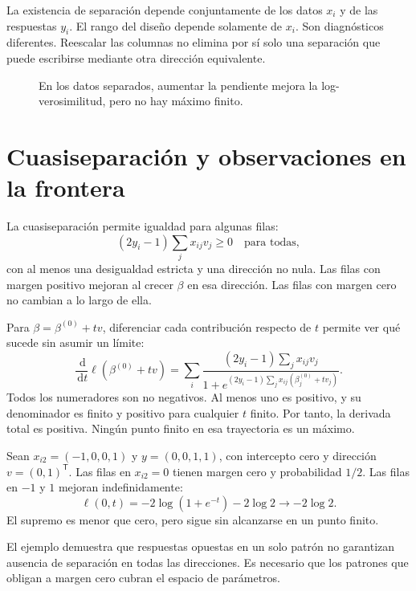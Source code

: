 \documentclass[11pt,a4paper]{article}
\newcommand{\T}{^{\mathsf T}}
\newcommand{\dd}{\,\mathrm d}
\begin{document}
La existencia de separación depende conjuntamente de los datos $x_i$
y de las respuestas $y_i$. El rango del diseño depende solamente
de $x_i$. Son diagnósticos diferentes.
Reescalar las columnas no elimina por sí solo una separación que
puede escribirse mediante otra dirección equivalente.

\begin{figure}[H]\centering
{}
\caption{En los datos separados, aumentar la pendiente mejora la log-verosimilitud, pero no hay máximo finito.}
\end{figure}

\clearpage
\section{Cuasiseparación y observaciones en la frontera}\label{logit37}
La cuasiseparación permite igualdad para algunas filas:
\[
(2y_i-1)\sum_jx_{ij}v_j\ge0\quad\text{para todas},
\]
con al menos una desigualdad estricta y una dirección no nula.
Las filas con margen positivo mejoran al crecer $\beta$ en esa dirección.
Las filas con margen cero no cambian a lo largo de ella.

Para $\beta=\beta^{(0)}+tv$, diferenciar cada contribución respecto de
$t$ permite ver qué sucede sin asumir un límite:
\[
\frac{\dd}{\dd t}\ell(\beta^{(0)}+tv)
=\sum_i
\frac{(2y_i-1)\sum_jx_{ij}v_j}
{1+e^{(2y_i-1)\sum_jx_{ij}(\beta_j^{(0)}+tv_j)}}.
\]
Todos los numeradores son no negativos.
Al menos uno es positivo, y su denominador es finito y positivo
para cualquier $t$ finito.
Por tanto, la derivada total es positiva.
Ningún punto finito en esa trayectoria es un máximo.

\begin{ejemplo}
Sean $x_{i2}=(-1,0,0,1)$ y $y=(0,0,1,1)$,
con intercepto cero y dirección $v=(0,1)\T$.
Las filas en $x_{i2}=0$ tienen margen cero y probabilidad $1/2$.
Las filas en $-1$ y $1$ mejoran indefinidamente:
\[
\ell(0,t)=-2\log(1+e^{-t})-2\log2
\longrightarrow-2\log2.
\]
El supremo es menor que cero, pero sigue sin alcanzarse en un punto finito.
\end{ejemplo}
El ejemplo demuestra que respuestas opuestas en un solo patrón
no garantizan ausencia de separación en todas las direcciones.
Es necesario que los patrones que obligan a margen cero cubran
el espacio de parámetros.
\end{document}
